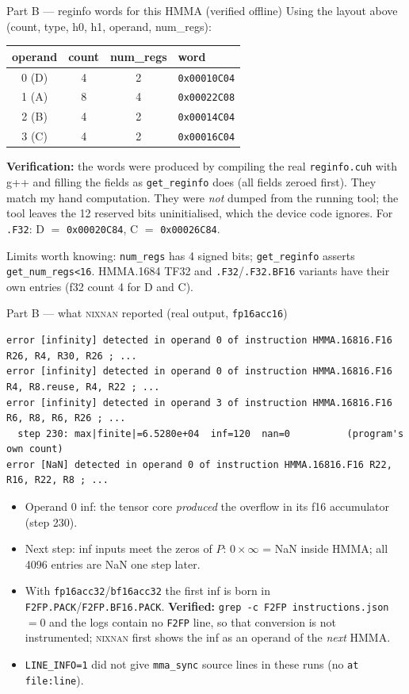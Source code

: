 \documentclass[aspectratio=169,10pt]{beamer}
\newcommand{\nn}{\textsc{nixnan}}
\begin{document}
\begin{frame}[fragile]{Part B --- reginfo words for this HMMA (verified offline)}
\small Using the layout above (count, type, h0, h1, operand, num\_regs):
\begin{center}\begin{tabular}{@{}cccl@{}}
operand & count & num\_regs & word\\\hline
0 (D) & 4 & 2 & \texttt{0x00010C04}\\
1 (A) & 8 & 4 & \texttt{0x00022C08}\\
2 (B) & 4 & 2 & \texttt{0x00014C04}\\
3 (C) & 4 & 2 & \texttt{0x00016C04}\\
\end{tabular}\end{center}
\textbf{Verification:} the words were produced by compiling the real \texttt{reginfo.cuh} with g++ and filling the fields as \texttt{get\_reginfo} does (all fields zeroed first). They match my hand computation. They were \emph{not} dumped from the running tool; the tool leaves the 12 reserved bits uninitialised, which the device code ignores. For \texttt{.F32}: D $=$ \texttt{0x00020C84}, C $=$ \texttt{0x00026C84}.

\bigskip
Limits worth knowing: \texttt{num\_regs} has 4 signed bits; \texttt{get\_reginfo} asserts \texttt{get\_num\_regs<16}. HMMA.1684 TF32 and \texttt{.F32}/\texttt{.F32.BF16} variants have their own entries (f32 count 4 for D and C).
\end{frame}

\begin{frame}[fragile]{Part B --- what \nn{} reported (real output, \texttt{fp16acc16})}
\begin{lstlisting}
error [infinity] detected in operand 0 of instruction HMMA.16816.F16 R26, R4, R30, R26 ; ...
error [infinity] detected in operand 0 of instruction HMMA.16816.F16 R4, R8.reuse, R4, R22 ; ...
error [infinity] detected in operand 3 of instruction HMMA.16816.F16 R6, R8, R6, R26 ; ...
  step 230: max|finite|=6.5280e+04  inf=120  nan=0          (program's own count)
error [NaN] detected in operand 0 of instruction HMMA.16816.F16 R22, R16, R22, R8 ; ...
\end{lstlisting}
\small
\begin{itemize}
\item Operand 0 inf: the tensor core \emph{produced} the overflow in its f16 accumulator (step 230).
\item Next step: inf inputs meet the zeros of $P$: $0\times\infty$ = NaN inside HMMA; all 4096 entries are NaN one step later.
\item With \texttt{fp16acc32}/\texttt{bf16acc32} the first inf is born in \texttt{F2FP.PACK}/\texttt{F2FP.BF16.PACK}. \textbf{Verified:} \texttt{grep -c F2FP instructions.json} $=0$ and the logs contain no \texttt{F2FP} line, so that conversion is not instrumented; \nn{} first shows the inf as an operand of the \emph{next} HMMA.
\item \texttt{LINE\_INFO=1} did not give \texttt{mma\_sync} source lines in these runs (no \texttt{at file:line}).
\end{itemize}
\end{frame}
\end{document}
